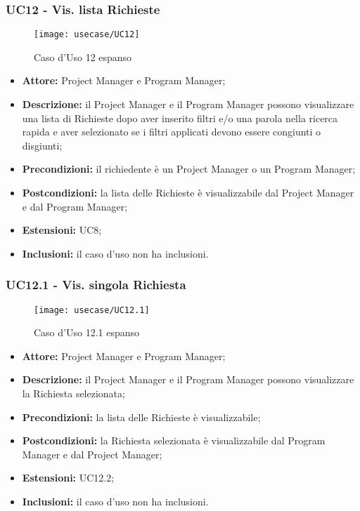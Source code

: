 \subsubsection*{UC12 - Vis. lista Richieste}

\begin{figure}[H] 
    \centering 
    \texttt{[image: usecase/UC12]} 
    \caption{Caso d'Uso 12 espanso}
\end{figure}

\begin{itemize}[label=$\circ$]
\item \textbf{Attore:} Project Manager e Program Manager;
\item \textbf{Descrizione:} il Project Manager e il Program Manager possono visualizzare una lista di Richieste dopo aver inserito filtri e/o una parola nella ricerca rapida e aver selezionato se i filtri applicati devono essere congiunti o disgiunti;
\item \textbf{Precondizioni:} il richiedente è un Project Manager o un Program Manager;
\item \textbf{Postcondizioni:} la lista delle Richieste è visualizzabile dal Project Manager e dal Program Manager;
\item \textbf{Estensioni:} UC8;
\item \textbf{Inclusioni:} il caso d'uso non ha inclusioni.
\end{itemize}

\subsubsection*{UC12.1 - Vis. singola Richiesta}

\begin{figure}[H] 
    \centering 
    \texttt{[image: usecase/UC12.1]} 
    \caption{Caso d'Uso 12.1 espanso}
\end{figure}

\begin{itemize}[label=$\circ$]
\item \textbf{Attore:} Project Manager e Program Manager;
\item \textbf{Descrizione:} il Project Manager e il Program Manager possono visualizzare la Richiesta selezionata;
\item \textbf{Precondizioni:} la lista delle Richieste è visualizzabile;
\item \textbf{Postcondizioni:} la Richiesta selezionata è visualizzabile dal Program Manager e dal Project Manager;
\item \textbf{Estensioni:} UC12.2;
\item \textbf{Inclusioni:} il caso d'uso non ha inclusioni.
\end{itemize}

